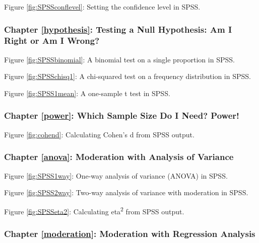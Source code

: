 \documentclass[a4paper]{book}
\theoremstyle{definition}
\theoremstyle{definition}
\theoremstyle{definition}
\theoremstyle{remark}
\begin{document}
Figure \ref{fig:SPSSconflevel}: Setting the confidence level in SPSS.

\subsubsection*{Chapter \ref{hypothesis}: Testing a Null Hypothesis: Am
I Right or Am I
Wrong?}\label{chapter-refhypothesis-testing-a-null-hypothesis-am-i-right-or-am-i-wrong}



Figure \ref{fig:SPSSbinomial}: A binomial test on a single proportion in SPSS.



Figure \ref{fig:SPSSchisq1}: A chi-squared test on a frequency distribution in SPSS.



Figure \ref{fig:SPSS1mean}: A one-sample t test in SPSS.

\subsubsection*{Chapter \ref{power}: Which Sample Size Do I Need?
Power!}\label{chapter-refpower-which-sample-size-do-i-need-power}



Figure \ref{fig:cohend}: Calculating Cohen's d from SPSS output.

\subsubsection*{Chapter \ref{anova}: Moderation with Analysis of
Variance}\label{chapter-refanova-moderation-with-analysis-of-variance}



Figure \ref{fig:SPSS1way}: One-way analysis of variance (ANOVA) in SPSS.



Figure \ref{fig:SPSS2way}: Two-way analysis of variance with moderation in SPSS.



Figure \ref{fig:SPSSeta2}: Calculating eta\textsuperscript{2} from SPSS output.

\subsubsection*{Chapter \ref{moderation}: Moderation with Regression
Analysis}\label{chapter-refmoderation-moderation-with-regression-analysis}
\end{document}
